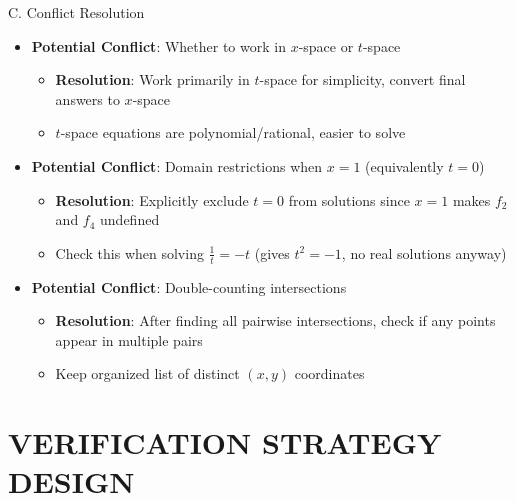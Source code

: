 \documentclass[12pt]{article}
\begin{document}
\begin{conversionbox}{C. Conflict Resolution}
\begin{itemize}[leftmargin=*]
    \item \textbf{Potential Conflict}: Whether to work in $x$-space or $t$-space
    \begin{itemize}
        \item \textbf{Resolution}: Work primarily in $t$-space for simplicity, convert final answers to $x$-space
        \item $t$-space equations are polynomial/rational, easier to solve
    \end{itemize}
    
    \item \textbf{Potential Conflict}: Domain restrictions when $x = 1$ (equivalently $t = 0$)
    \begin{itemize}
        \item \textbf{Resolution}: Explicitly exclude $t = 0$ from solutions since $x = 1$ makes $f_2$ and $f_4$ undefined
        \item Check this when solving $\frac{1}{t} = -t$ (gives $t^2 = -1$, no real solutions anyway)
    \end{itemize}
    
    \item \textbf{Potential Conflict}: Double-counting intersections
    \begin{itemize}
        \item \textbf{Resolution}: After finding all pairwise intersections, check if any points appear in multiple pairs
        \item Keep organized list of distinct $(x, y)$ coordinates
    \end{itemize}
\end{itemize}
\end{conversionbox}

\section{VERIFICATION STRATEGY DESIGN}
\end{document}
